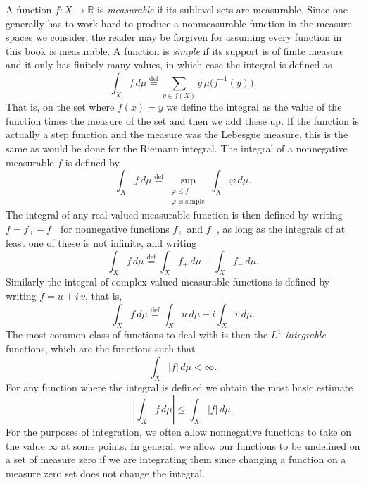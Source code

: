 \documentclass[12pt,openany]{book}
\newcommand{\sabs}[1]{\lvert {#1} \rvert}
\newcommand{\abs}[1]{\left\lvert {#1} \right\rvert}
\newcommand{\R}{{\mathbb{R}}}
\newcommand{\myindex}[1]{#1\index{#1}}
\theoremstyle{plain}
\theoremstyle{remark}
\theoremstyle{definition}
\theoremstyle{exercise}
\theoremstyle{example}
\begin{document}
A function $f \colon X \to \R$ is
\emph{measurable} if its sublevel
sets are measurable.
Since one generally has to work hard to produce a
\myindex{nonmeasurable function}
in the measure spaces we consider,
the reader may be forgiven for assuming every function in
this book is measurable.
A function is
\emph{simple}
if its support is of finite
measure and it only has finitely many values, in which case the integral is
defined as
\begin{equation*}
\int_X f\, d \mu
\overset{\text{def}}{=}
\sum_{y \in f(X)}
y \, \mu\bigl(f^{-1}(y)\bigr) .
\end{equation*}
That is, on the set where $f(x)=y$ we define the integral as the value of
the function times the measure of the set and then we add these up.
If the function is actually a step function and the measure was the Lebesgue
measure, this is the same as would be done for the Riemann integral.
The integral of a nonnegative measurable $f$ is defined by
\begin{equation*}
\int_X f\, d \mu
\overset{\text{def}}{=}
\sup_{\substack{\varphi \leq f \\ \varphi \text{ is simple}}}
\int_X \varphi \, d\mu .
\end{equation*}
The integral of any real-valued measurable function is
then defined by writing $f = f_+ - f_-$ for
nonnegative functions $f_+$ and $f_-$, as long as
the integrals of at least one of these is not infinite, and writing
\begin{equation*}
\int_X f\, d \mu
\overset{\text{def}}{=}
\int_X f_+\, d \mu
-
\int_X f_-\, d \mu .
\end{equation*}
Similarly the integral of
complex-valued measurable functions is defined by writing $f = u + i \, v$,
that is,
\begin{equation*}
\int_X f\, d \mu
\overset{\text{def}}{=}
\int_X u\, d \mu
-
i
\int_X v\, d \mu .
\end{equation*}
The most common class of functions to deal with is then the
\emph{$L^1$-integrable}
functions, which are the functions such that
\begin{equation*}
\int_X \sabs{f} \, d\mu < \infty .
\end{equation*}
For any function where the integral is defined we obtain
the most basic estimate
\begin{equation*}
\abs{\int_X f \, d\mu} \leq
\int_X \sabs{f} \, d\mu .
\end{equation*}
For the purposes of integration, we often allow nonnegative
functions to take on the value $\infty$ at some points.
In general, we allow our functions to
be undefined on a set of measure zero if we are integrating them since
changing a function on a measure zero set does not change the integral.
\end{document}
